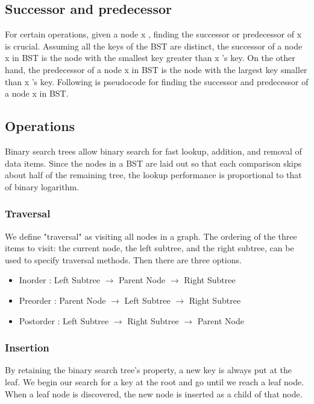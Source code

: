 \documentclass[11pt]{article}
\begin{document}
    \subsection{Successor and predecessor}
    For certain operations, given a node x , finding the successor or predecessor of x is crucial. Assuming all the keys of the BST are distinct, the successor of a node x in BST is the node with the smallest key greater than x 's key. On the other hand, the predecessor of a node x in BST is the node with the largest key smaller than x 's key. Following is pseudocode for finding the successor and predecessor of a node x in BST.
    
    \subsection{Operations}
    Binary search trees allow binary search for fast lookup, addition, and removal of data items. Since the nodes in a BST are laid out so that each comparison skips about half of the remaining tree, the lookup performance is proportional to that of binary logarithm.

        \subsubsection{Traversal}
        We define "traversal" as visiting all nodes in a graph. The ordering of the three items to visit: the current node, the left subtree, and the right subtree, can be used to specify traversal methods. Then there are three options.

        \begin{itemize}
            \item Inorder : Left Subtree $\rightarrow$ Parent Node $\rightarrow$ Right Subtree
            \item Preorder : Parent Node $\rightarrow$ Left Subtree $\rightarrow$ Right Subtree
            \item Postorder : Left Subtree $\rightarrow$ Right Subtree $\rightarrow$ Parent Node
        \end{itemize}

        \subsubsection{Insertion}
        By retaining the binary search tree's property, a new key is always put at the leaf. We begin our search for a key at the root and go until we reach a leaf node. When a leaf node is discovered, the new node is inserted as a child of that node.\newline
\end{document}
